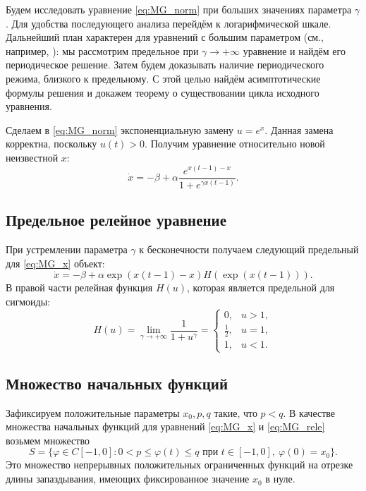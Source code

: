 Будем исследовать уравнение \eqref{eq:MG_norm} при больших значениях параметра $\gamma$. Для удобства последующего анализа перейдём к логарифмической шкале. Дальнейший план характерен для уравнений с большим параметром (см., например, \cite{Kolesov2010}): мы рассмотрим предельное при $\gamma\to+\infty$ уравнение и найдём его периодическое решение. Затем будем доказывать наличие периодического режима, близкого к предельному. С этой целью найдём асимптотические формулы решения и докажем теорему о существовании цикла исходного уравнения.

Сделаем в \eqref{eq:MG_norm} экспоненциальную замену $u=e^x$. Данная замена корректна, поскольку $u(t) > 0$. Получим уравнение относительно новой неизвестной $x$:
\begin{equation}
    \label{eq:MG_x}
    \dot{x}=-\beta+\alpha\frac{e^{x(t-1)-x}}{1+e^{\gamma x(t-1)}}.
\end{equation}

\subsection{Предельное релейное уравнение}
При устремлении параметра $\gamma$ к бесконечности получаем следующий предельный для \eqref{eq:MG_x} объект:
\begin{equation}
    \label{eq:MG_rele}
    \dot{x}=-\beta + \alpha \exp({x(t-1)-x})H(\exp({x(t-1)})).
\end{equation}
В правой части релейная функция $H(u)$, которая является предельной для сигмоиды:
\begin{equation}
    \label{eq:H}
    H(u)=\lim\limits_{\gamma\to +\infty}\frac{1}{1+u^{\gamma}}=
    \begin{cases}
        0, & u > 1,\\
        \frac{1}{2}, & u = 1,\\
        1, & u < 1.
    \end{cases}
\end{equation}

\subsection{Множество начальных функций}
Зафиксируем положительные параметры $x_0, p, q$ такие, что $p < q$. В качестве множества начальных функций для уравнений \eqref{eq:MG_x} и \eqref{eq:MG_rele} возьмем множество
\begin{equation}
    \label{eq:init_set}
    S=\{\varphi\in C[-1,0]: 0 < p \leqslant \varphi(t)\leqslant q \text{ при } t\in[-1,0],\ \varphi(0)=x_0\}.
\end{equation}
Это множество непрерывных положительных ограниченных функций на отрезке длины запаздывания, имеющих фиксированное значение $x_0$ в нуле.


